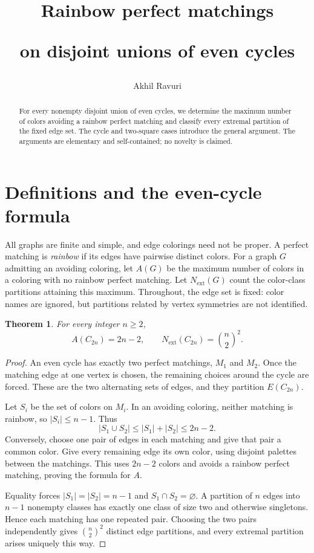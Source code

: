 \documentclass[11pt,letterpaper]{article}
\title{\vspace{-1.5em}\LARGE\bfseries Rainbow perfect matchings\par
  \Large on disjoint unions of even cycles}
\author{Akhil Ravuri}
\date{}
\newtheorem{theorem}{Theorem}
\newcommand{\Next}{N_{\mathrm{ext}}}
\begin{document}
\maketitle
\vspace{-1.5em}
\begin{abstract}
For every nonempty disjoint union of even cycles, we determine the maximum
number of colors avoiding a rainbow perfect matching and classify every
extremal partition of the fixed edge set. The cycle and two-square cases
introduce the general argument.
The arguments are elementary and self-contained; no novelty is claimed.
\end{abstract}

\section{Definitions and the even-cycle formula}
All graphs are finite and simple, and edge colorings need not be proper.
A perfect matching is \emph{rainbow} if its edges have pairwise distinct
colors. For a graph $G$ admitting an avoiding coloring, let $A(G)$ be the
maximum number of colors in a coloring with no rainbow perfect matching.
Let $\Next(G)$ count the color-class partitions attaining this maximum.
Throughout, the edge set is fixed: color names are ignored, but partitions
related by vertex symmetries are not identified.

\begin{theorem}\label{thm:cycles}
For every integer $n\ge 2$,
\[
  A(C_{2n})=2n-2,
  \qquad
  \Next(C_{2n})=\binom{n}{2}^{\!2}.
\]
\end{theorem}

\begin{proof}
An even cycle has exactly two perfect matchings, $M_1$ and $M_2$.
Once the matching edge at one vertex is chosen, the remaining choices
around the cycle are forced. These are the two alternating sets of edges,
and they partition $E(C_{2n})$.

Let $S_i$ be the set of colors on $M_i$. In an avoiding coloring, neither
matching is rainbow, so $|S_i|\le n-1$. Thus
\[
  |S_1\cup S_2|\le |S_1|+|S_2|\le 2n-2.
\]
Conversely, choose one pair of edges in each matching and give that pair
a common color. Give every remaining edge its own color, using disjoint
palettes between the matchings. This uses $2n-2$ colors and avoids a rainbow
perfect matching, proving the formula for $A$.

Equality forces $|S_1|=|S_2|=n-1$ and $S_1\cap S_2=\varnothing$.
A partition of $n$ edges into $n-1$ nonempty classes has exactly one
class of size two and otherwise singletons. Hence each matching has one
repeated pair. Choosing the two pairs independently gives
$\binom{n}{2}^2$ distinct edge partitions, and every extremal partition
arises uniquely this way.
\end{proof}
\end{document}
